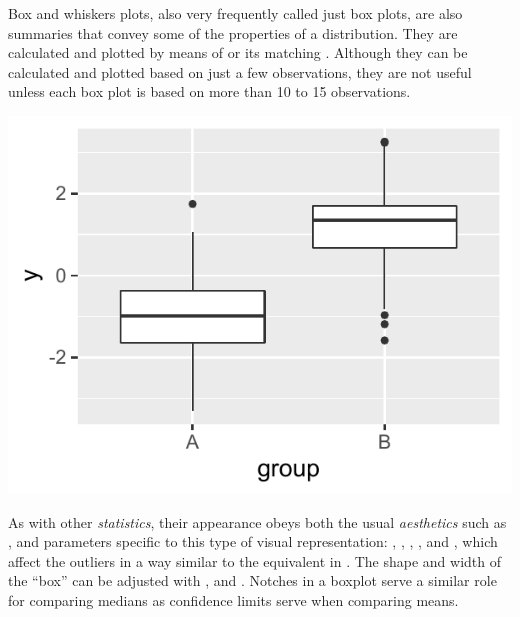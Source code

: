 \documentclass[krantz2]{krantz}\usepackage{knitr}
\begin{document}
Box and whiskers plots, also very frequently called just box plots, are also summaries that convey some of the properties of a distribution. They are calculated and plotted by means of  or its matching . Although they can be calculated and plotted based on just a few observations, they are not useful unless each box plot is based on more than 10 to 15 observations.

\begin{knitrout}\footnotesize
{}\color{fgcolor}\begin{kframe}
\begin{alltt}
  \hlopt{+}
  \hlstd{()}
\end{alltt}
\end{kframe}

{\centering \includegraphics[width=.54\textwidth]{figure/pos-bw-plot-01-1} 

}


\end{knitrout}

As with other \emph{statistics}, their appearance obeys both the usual \emph{aesthetics} such as , and parameters specific to this type of visual representation: , , , ,  and , which affect the outliers in a way similar to the equivalent  in . The shape and width of the ``box'' can be adjusted with ,  and . Notches in a boxplot serve a similar role for comparing medians as confidence limits serve when comparing means.
\end{document}
